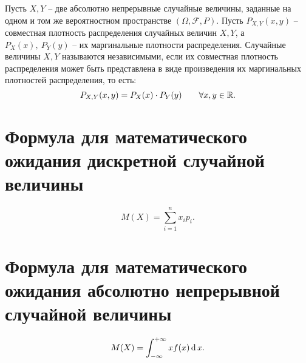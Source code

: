 \begin{theorem}
	Пусть $X,Y$ -- две абсолютно непрерывные случайные величины, заданные на одном и том же вероятностном пространстве $(\Omega ,\mathcal{F},P)$. Пусть $P_{X,Y}(x,y)$ -- совместная плотность распределения случайных величин $X,Y$, а $P_X(x), \ P_Y(y)$ -- их маргинальные плотности распределения. Случайные величины $X,Y$ называются независимыми, если их совместная плотность распределения может быть представлена в виде произведения их маргинальных плотностей распределения, то есть:
	\[
		P_{X,Y} (x,y) = P_X(x)\cdot P_Y(y) \qquad \forall x,y \in \mathbb{R}.
	\]
\end{theorem}

\section{Формула для математического ожидания дискретной случайной величины}

\[
	M(X) = \sum_{i=1}^{n} x_ip_i.
\]

\section{Формула для математического ожидания абсолютно непрерывной случайной величины}

\[
	M(X) = \int_{-\infty }^{+\infty } x f(x) \operatorname{d} x.
\]
